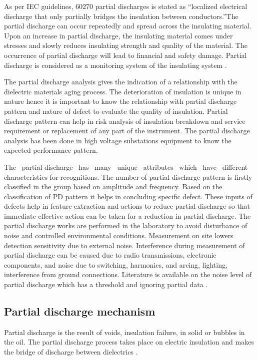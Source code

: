 As per IEC guidelines, 60270 partial discharges is stated as \textquotedblleft localized electrical discharge that only partially bridges the insulation between conductors.\textquotedblright The partial discharge can occur repeatedly and spread across the insulating material. Upon an increase in partial discharge, the insulating material comes under stresses and slowly reduces insulating strength and quality of the material. The occurrence of partial discharge will lead to financial and safety damage. Partial discharge is considered as a monitoring system of the insulating system \cite{xiao2006time, standard2000high, wadhwa2007high, danikas1993definitions}.
 
The partial discharge analysis gives the indication of a relationship with the dielectric materials aging process. The deterioration of insulation is unique in nature hence it is important to know the relationship with partial discharge pattern and nature of defect to evaluate the quality of insulation. Partial discharge pattern can help in risk analysis of insulation breakdown and service requirement or replacement of any part of the instrument. The partial discharge analysis has been done in high voltage substations equipment to know the expected performance pattern.

The ~partial discharge ~has ~many ~unique ~attributes ~which ~have ~different characteristics for recognitions. The number of partial discharge pattern is firstly classified in the group based on amplitude and frequency. Based on the classification of PD pattern it helps in concluding specific defect. These inputs of defects help in feature extraction and actions to reduce partial discharge so that immediate effective action can be taken for a reduction in partial discharge. The partial discharge works are performed in the laboratory to avoid disturbance of noise and controlled environmental conditions. Measurement on site lowers detection sensitivity due to external noise. Interference during measurement of partial discharge can be caused due to radio transmissions, electronic components, and noise due to switching, harmonics, and arcing, lighting, interference from ground connections. Literature is available on the noise level of partial discharge which has a threshold and ignoring partial data \setlength{\parskip}{0em} \cite{guastavino2011morphologic, stone2005partial, schwarz2008review, muhr2006partial, reddy2014detection, coenen2008sensitivity}.

\subsection{Partial discharge mechanism}
Partial discharge is the result of voids, insulation failure, in solid or bubbles in the oil. The partial discharge process takes place on electric insulation and makes the bridge of discharge between dielectrics \setlength{\parskip}{1em}.

